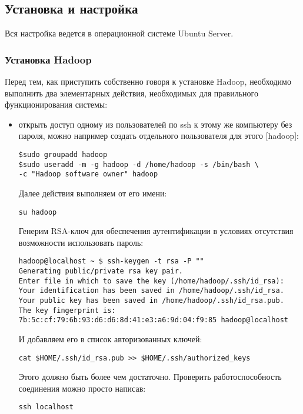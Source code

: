 \subsection{Установка и настройка}
Вся настройка ведется в операционной системе Ubuntu Server.

\subsubsection{Установка Hadoop}
Перед тем, как приступить собственно говоря к установке Hadoop, необходимо выполнить два элементарных действия,
необходимых для правильного функционирования системы:
\begin{itemize}
\item открыть доступ одному из пользователей по ssh к этому же компьютеру без пароля,
можно например создать отдельного пользователя для этого [hadoop]:
\begin{lstlisting}[label=lst:haddop1,caption=Создаем пользователя с правами]
$sudo groupadd hadoop
$sudo useradd -m -g hadoop -d /home/hadoop -s /bin/bash \
-c "Hadoop software owner" hadoop
\end{lstlisting}

Далее действия выполняем от его имени:
\begin{lstlisting}[label=lst:haddop2,caption=Логинимся под пользователем hadoop]
su hadoop
\end{lstlisting}

Генерим RSA-ключ для обеспечения аутентификации в условиях отсутствия возможности использовать пароль:
\begin{lstlisting}[label=lst:haddop3,caption=Генерим RSA-ключ]
hadoop@localhost ~ $ ssh-keygen -t rsa -P ""
Generating public/private rsa key pair.
Enter file in which to save the key (/home/hadoop/.ssh/id_rsa):
Your identification has been saved in /home/hadoop/.ssh/id_rsa.
Your public key has been saved in /home/hadoop/.ssh/id_rsa.pub.
The key fingerprint is:
7b:5c:cf:79:6b:93:d6:d6:8d:41:e3:a6:9d:04:f9:85 hadoop@localhost
\end{lstlisting}

И добавляем его в список авторизованных ключей:
\begin{lstlisting}[label=lst:haddop4,caption=Добавляем его в список авторизованных ключей]
cat $HOME/.ssh/id_rsa.pub >> $HOME/.ssh/authorized_keys
\end{lstlisting}

Этого должно быть более чем достаточно. Проверить работоспособность соединения можно просто написав:
\begin{lstlisting}[label=lst:haddop5,caption=Пробуем зайти на ssh без пароля]
ssh localhost
\end{lstlisting}


\end{itemize}
